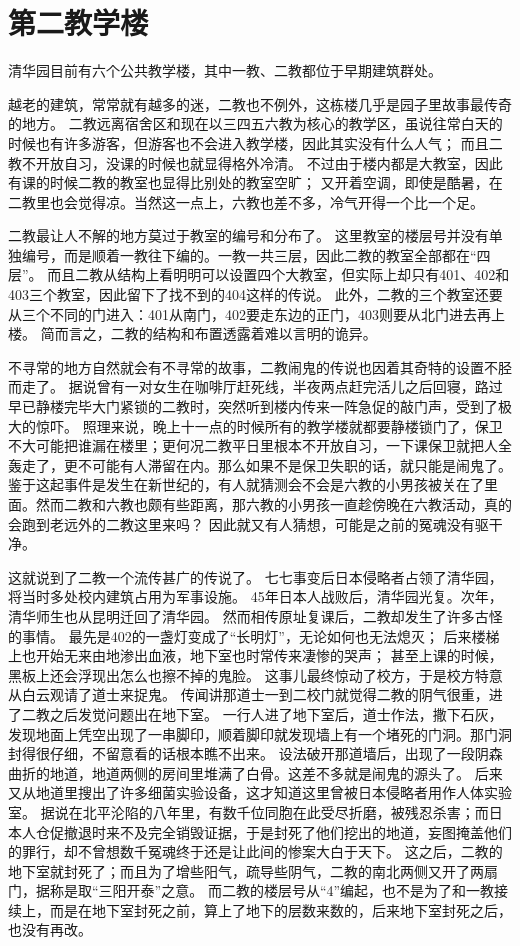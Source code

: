 \chapter{第二教学楼}

清华园目前有六个公共教学楼，其中一教、二教都位于早期建筑群处。


越老的建筑，常常就有越多的迷，二教也不例外，这栋楼几乎是园子里故事最传奇的地方。
二教远离宿舍区和现在以三四五六教为核心的教学区，虽说往常白天的时候也有许多游客，但游客也不会进入教学楼，因此其实没有什么人气；
而且二教不开放自习，没课的时候也就显得格外冷清。
不过由于楼内都是大教室，因此有课的时候二教的教室也显得比别处的教室空旷；
又开着空调，即使是酷暑，在二教里也会觉得凉。当然这一点上，六教也差不多，冷气开得一个比一个足。

二教最让人不解的地方莫过于教室的编号和分布了。
这里教室的楼层号并没有单独编号，而是顺着一教往下编的。一教一共三层，因此二教的教室全部都在“四层”。
而且二教从结构上看明明可以设置四个大教室，但实际上却只有401、402和403三个教室，因此留下了找不到的404这样的传说。
此外，二教的三个教室还要从三个不同的门进入：401从南门，402要走东边的正门，403则要从北门进去再上楼。
简而言之，二教的结构和布置透露着难以言明的诡异。

不寻常的地方自然就会有不寻常的故事，二教闹鬼的传说也因着其奇特的设置不胫而走了。
据说曾有一对女生在咖啡厅赶死线，半夜两点赶完活儿之后回寝，路过早已静楼完毕大门紧锁的二教时，突然听到楼内传来一阵急促的敲门声，受到了极大的惊吓。
照理来说，晚上十一点的时候所有的教学楼就都要静楼锁门了，保卫不大可能把谁漏在楼里；更何况二教平日里根本不开放自习，一下课保卫就把人全轰走了，更不可能有人滞留在内。那么如果不是保卫失职的话，就只能是闹鬼了。
鉴于这起事件是发生在新世纪的，有人就猜测会不会是六教的小男孩被关在了里面。然而二教和六教也颇有些距离，那六教的小男孩一直趁傍晚在六教活动，真的会跑到老远外的二教这里来吗？
因此就又有人猜想，可能是之前的冤魂没有驱干净。

这就说到了二教一个流传甚广的传说了。
七七事变后日本侵略者占领了清华园，将当时多处校内建筑占用为军事设施。
45年日本人战败后，清华园光复。次年，清华师生也从昆明迁回了清华园。
然而相传原址复课后，二教却发生了许多古怪的事情。
最先是402的一盏灯变成了“长明灯”，无论如何也无法熄灭；
后来楼梯上也开始无来由地渗出血液，地下室也时常传来凄惨的哭声；
甚至上课的时候，黑板上还会浮现出怎么也擦不掉的鬼脸。
这事儿最终惊动了校方，于是校方特意从白云观请了道士来捉鬼。
传闻讲那道士一到二校门就觉得二教的阴气很重，进了二教之后发觉问题出在地下室。
一行人进了地下室后，道士作法，撒下石灰，发现地面上凭空出现了一串脚印，顺着脚印就发现墙上有一个堵死的门洞。那门洞封得很仔细，不留意看的话根本瞧不出来。
设法破开那道墙后，出现了一段阴森曲折的地道，地道两侧的房间里堆满了白骨。这差不多就是闹鬼的源头了。
后来又从地道里搜出了许多细菌实验设备，这才知道这里曾被日本侵略者用作人体实验室。
据说在北平沦陷的八年里，有数千位同胞在此受尽折磨，被残忍杀害；而日本人仓促撤退时来不及完全销毁证据，于是封死了他们挖出的地道，妄图掩盖他们的罪行，却不曾想数千冤魂终于还是让此间的惨案大白于天下。
这之后，二教的地下室就封死了；而且为了增些阳气，疏导些阴气，二教的南北两侧又开了两扇门，据称是取“三阳开泰”之意。
而二教的楼层号从“4”编起，也不是为了和一教接续上，而是在地下室封死之前，算上了地下的层数来数的，后来地下室封死之后，也没有再改。

